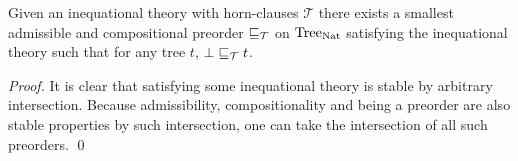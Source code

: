 \begin{alemma}
    \label{lem:freepreo}
    Given an inequational theory with horn-clauses $\mathcal{T}$
    there exists a smallest admissible 
    and compositional preorder $\sqsubseteq_\mathcal{T}$ 
    on $\textnormal{Tree}_{\textnormal{Nat}}$ satisfying the inequational theory 
    such that for any tree $t$, $\bot \sqsubseteq_\mathcal{T} t$.
\end{alemma}

\begin{proof}
    It is clear that satisfying some inequational 
    theory is stable by arbitrary intersection. Because 
    admissibility, compositionality and being 
    a preorder are also 
    stable properties by such intersection, one 
    can take the intersection of all such preorders.
\qed\end{proof}
